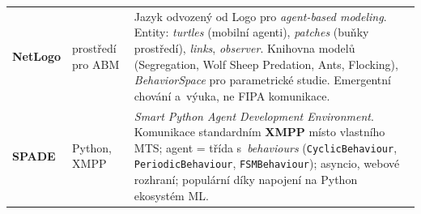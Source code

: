 \documentclass[11pt,a4paper]{article}
\theoremstyle{definition}
\begin{document}
\begin{center}
\begin{tabular}{p{} p{} p{}}
\textbf{NetLogo}
  & prostředí pro ABM
  & Jazyk odvozený od Logo pro \emph{agent-based modeling}. Entity: \emph{turtles} (mobilní
    agenti), \emph{patches} (buňky prostředí), \emph{links}, \emph{observer}. Knihovna
    modelů (Segregation, Wolf Sheep Predation, Ants, Flocking), \emph{BehaviorSpace} pro
    parametrické studie. Emergentní chování a~výuka, ne FIPA komunikace. \\
\textbf{SPADE}
  & Python, XMPP
  & \emph{Smart Python Agent Development Environment}. Komunikace standardním
    \textbf{XMPP} místo vlastního MTS; agent = třída s~\emph{behaviours}
    (\texttt{CyclicBehaviour}, \texttt{PeriodicBehaviour}, \texttt{FSMBehaviour}); asyncio,
    webové rozhraní; populární díky napojení na Python ekosystém ML. \\
\bottomrule
\end{tabular}
\end{center}
\end{document}
